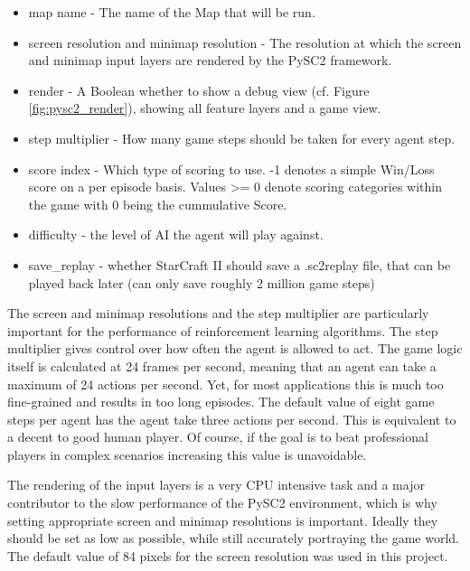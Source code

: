 \begin{itemize}  
\item map name - The name of the Map that will be run.
\item screen resolution and minimap resolution - The resolution at which the screen and minimap input layers are rendered by the PySC2 framework.
\item render - A Boolean whether to show a debug view (cf. Figure \ref{fig:pysc2_render}), showing all feature layers and a game view.
\item step multiplier - How many game steps should be taken for every agent step. 
\item score index - Which type of scoring to use. -1 denotes a simple Win/Loss score on a per episode basis. Values >= 0 denote scoring categories within the game with 0 being the cummulative Score.
\item difficulty - the level of AI the agent will play against. 
\item save\_replay - whether StarCraft II should save a .sc2replay file, that can be played back later (can only save roughly 2 million game steps)
\end{itemize}

The screen and minimap resolutions and the step multiplier are particularly important for the performance of reinforcement learning algorithms.
The step multiplier gives control over how often the agent is allowed to act. The game logic itself is calculated at 24 frames per second, meaning that an agent can take a maximum of 24 actions per second. Yet, for most applications this is much too fine-grained and results in too long episodes. The default value of eight game steps per agent has the agent take three actions per second. This is equivalent to a decent to good human player. Of course, if the goal is to beat professional players in complex scenarios increasing this value is unavoidable.

The rendering of the input layers is a very CPU intensive task and a major contributor to the slow performance of the PySC2 environment, which is why setting appropriate screen and minimap resolutions is important. Ideally they should be set as low as possible, while still accurately portraying the game world. The default value of 84 pixels for the screen resolution was used in this project.



